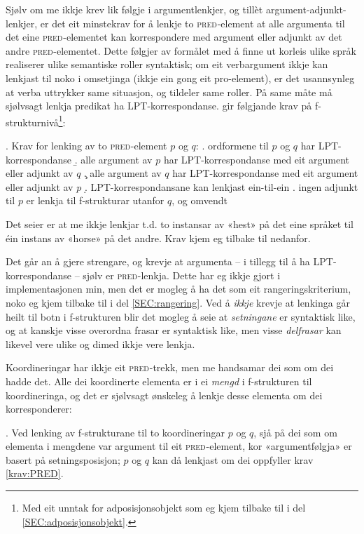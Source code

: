 \documentclass[12pt,a4paper,oneside,draft]{report}
\newcommand{\F}[2]{\textsc{#1}\ensuremath{_{#2}}}
\newcommand{\PRED}{\F{pred}{}}
\begin{document}
Sjølv om me ikkje krev lik følgje i argumentlenkjer, og tillèt
argument-adjunkt-lenkjer, er det eit minstekrav for å lenkje to
\PRED{}-element at alle argumenta til det eine \PRED{}-elementet kan
korrespondere med argument eller adjunkt av det andre \PRED{}-elementet.
Dette følgjer av formålet med å finne ut korleis ulike språk
realiserer ulike semantiske roller syntaktisk; om eit verbargument
ikkje kan lenkjast til noko i omsetjinga (ikkje ein gong eit
pro-element), er det usannsynleg at verba uttrykker same situasjon, og
tildeler same roller. På same måte må sjølvsagt lenkja predikat ha
LPT\hyp{}korrespondanse. \citet[s.~75]{dyvik2009lmp} gir følgjande krav på
f\hyp{}strukturnivå\footnote{Med eit unntak for adposisjonsobjekt som eg kjem tilbake til i
        del \ref{SEC:adposisjonsobjekt}. }:

\ex. \label{krav:PRED} Krav for lenking av to \PRED{}-element $p$ og $q$:
\a. ordformene til $p$ og $q$ har LPT\hyp{}korrespondanse
\b. alle argument av $p$ har LPT\hyp{}korrespondanse med eit argument eller adjunkt av $q$
\c. alle argument av $q$ har LPT\hyp{}korrespondanse med eit argument eller adjunkt av $p$
\d. LPT\hyp{}korrespondansane kan lenkjast ein-til-ein
\e. ingen adjunkt til $p$ er lenkja til f\hyp{}strukturar utanfor $q$, og omvendt

Det \Last[d] seier er at me ikkje lenkjar t.d. to instansar av «hest»
på det eine språket til éin instans av «horse» på det andre. Krav
\Last[e] kjem eg tilbake til nedanfor. 

Det går an å gjere \Last strengare, og krevje at argumenta -- i
tillegg til å ha LPT\hyp{}korrespondanse -- sjølv er \PRED{}-lenkja. Dette har
eg ikkje gjort i implementasjonen min, men det er mogleg å ha det som
eit rangeringskriterium, noko eg kjem tilbake til i del
\ref{SEC:rangering}. Ved å \emph{ikkje} krevje at lenkinga går heilt til
botn i f\hyp{}strukturen blir det mogleg å seie at \emph{setningane} er
syntaktisk like, og at kanskje visse overordna frasar er syntaktisk
like, men visse \emph{delfrasar} kan likevel vere ulike og dimed ikkje vere
lenkja.

 Koordineringar har ikkje eit \PRED{}-trekk, men me handsamar dei som
 om dei hadde det. Alle dei koordinerte elementa er i ei \emph{mengd} i
 f\hyp{}strukturen til koordineringa, og det er sjølvsagt ønskeleg å lenkje
 desse elementa om dei korresponderer:

 \ex. \label{krav:COORD} Ved lenking av f\hyp{}strukturane til to
 koordineringar $p$ og $q$, sjå på dei som om elementa i mengdene var
 argument til eit \PRED{}-element, kor «argumentfølgja» er basert på
 setningsposisjon; $p$ og $q$ kan då lenkjast om dei oppfyller krav
 \ref{krav:PRED}.
\end{document}
